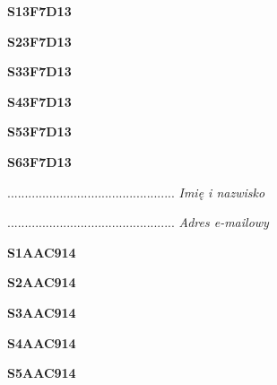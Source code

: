 \begin{turn}{90}\huge \textbf{S13F7D13}\end{turn}

\begin{turn}{90}\huge \textbf{S23F7D13}\end{turn}

\begin{turn}{90}\huge \textbf{S33F7D13}\end{turn}

\begin{turn}{90}\huge \textbf{S43F7D13}\end{turn}

\begin{turn}{90}\huge \textbf{S53F7D13}\end{turn}

\begin{turn}{90}\huge \textbf{S63F7D13}\end{turn}

\begin{turn}{90}\begin{minipage}{\linewidth} \vspace{20mm} ................................................  \textit{Imię i nazwisko}\end{minipage}\end{turn}

\begin{turn}{90}\begin{minipage}{\linewidth} \vspace{20mm} ................................................  \textit{Adres e-mailowy}\end{minipage}\end{turn}

\begin{turn}{90}\huge \textbf{S1AAC914}\end{turn}

\begin{turn}{90}\huge \textbf{S2AAC914}\end{turn}

\begin{turn}{90}\huge \textbf{S3AAC914}\end{turn}

\begin{turn}{90}\huge \textbf{S4AAC914}\end{turn}

\begin{turn}{90}\huge \textbf{S5AAC914}\end{turn}

